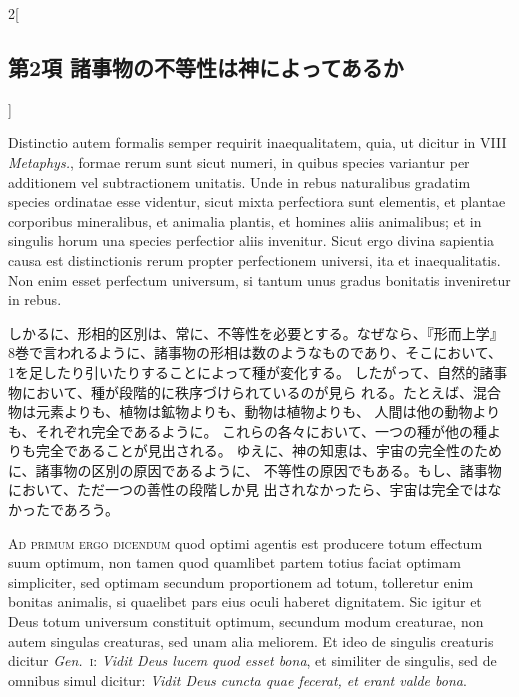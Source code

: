 \documentclass[paper=a4paper,fontsize=10pt,jafontsize=9pt,titlepage]{jlreq}
\begin{document}
\begin{paracol}{2}[\subsection{第2項 諸事物の不等性は神によってあるか}]
\switchcolumn*


Distinctio autem formalis semper requirit inaequalitatem, quia, ut
dicitur in VIII {\itshape Metaphys.}, formae rerum sunt sicut numeri, in
quibus species variantur per additionem vel subtractionem unitatis. Unde
in rebus naturalibus gradatim species ordinatae esse videntur, sicut
mixta perfectiora sunt elementis, et plantae corporibus mineralibus, et
animalia plantis, et homines aliis animalibus; et in singulis horum una
species perfectior aliis invenitur. Sicut ergo divina sapientia causa
est distinctionis rerum propter perfectionem universi, ita et
inaequalitatis. Non enim esset perfectum universum, si tantum unus
gradus bonitatis inveniretur in rebus.


\switchcolumn


しかるに、形相的区別は、常に、不等性を必要とする。なぜなら、『形而上学』
 8巻で言われるように、諸事物の形相は数のようなものであり、そこにおいて、
 1を足したり引いたりすることによって種が変化する。
したがって、自然的諸事物において、種が段階的に秩序づけられているのが見ら
 れる。たとえば、混合物は元素よりも、植物は鉱物よりも、動物は植物よりも、
 人間は他の動物よりも、それぞれ完全であるように。
これらの各々において、一つの種が他の種よりも完全であることが見出される。
ゆえに、神の知恵は、宇宙の完全性のために、諸事物の区別の原因であるように、
 不等性の原因でもある。もし、諸事物において、ただ一つの善性の段階しか見
 出されなかったら、宇宙は完全ではなかったであろう。


\switchcolumn*[\subsection{ad.1}]


{\scshape Ad primum ergo dicendum} quod optimi agentis est producere
totum effectum suum optimum, non tamen quod quamlibet partem totius
faciat optimam simpliciter, sed optimam secundum proportionem ad totum,
tolleretur enim bonitas animalis, si quaelibet pars eius oculi haberet
dignitatem. Sic igitur et Deus totum universum constituit optimum,
secundum modum creaturae, non autem singulas creaturas, sed unam alia
meliorem. Et ideo de singulis creaturis dicitur {\itshape
Gen.}~{\scshape i}: {\itshape Vidit Deus lucem quod esset bona}, et
similiter de singulis, sed de omnibus simul dicitur: {\itshape Vidit
Deus cuncta quae fecerat, et erant valde bona}.


\switchcolumn



\end{paracol}
\end{document}
